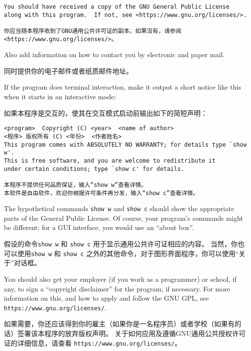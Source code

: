 \documentclass[11pt]{article}
\begin{document}
\begin{enumerate}
{\begin{verbatim}
You should have received a copy of the GNU General Public License
along with this program.  If not, see <https://www.gnu.org/licenses/>.

你应当随本程序收到了GNU通用公共许可证的副本，如果没有，请参阅<https://www.gnu.org/licenses/>。
\end{verbatim}
          }

        Also add information on how to contact you by electronic and paper mail.

        同时提供你的电子邮件或者纸质邮件地址。

        If the program does terminal interaction, make it output a short
        notice like this when it starts in an interactive mode:

        如果本程序是交互的，使其在交互模式启动前输出如下的简短声明：

        {\footnotesize
        \begin{verbatim}
<program>  Copyright (C) <year>  <name of author>
<程序> 版权所有 (C) <年份>  <作者姓名>
This program comes with ABSOLUTELY NO WARRANTY; for details type `show w'.
This is free software, and you are welcome to redistribute it
under certain conditions; type `show c' for details.

本程序不提供任何品质保证，输入“show w”查看详情。
本软件是自由软件，欢迎你根据许可条件再分发，输入“show c”查看详情。
\end{verbatim}
        }

        The hypothetical commands {\tt show w} and {\tt show c} should show
        the appropriate
        parts of the General Public License.  Of course, your program's commands
        might be different; for a GUI interface, you would use an ``about box''.

        假设的命令{\tt show w} 和 {\tt show c} 用于显示通用公共许可证相应的内容。
        当然，你也可以使用{\tt show w} 和 {\tt show c} 之外的其他命令，对于图形界面程序，你可以使用“关于”对话框。

        You should also get your employer (if you work as a programmer) or
        school, if any, to sign a ``copyright disclaimer'' for the program, if
        necessary.  For more information on this, and how to apply and follow
        the GNU GPL, see \texttt{https://www.gnu.org/licenses/}.

        如果需要，你还应该得到你的雇主（如果你是一名程序员）或者学校（如果有的话）签署该本程序的放弃版权声明。
        关于如何应用及遵循GNU通用公共授权许可证的详细信息，请查看 \texttt{https://www.gnu.org/licenses/}。


\end{enumerate}
\end{document}
